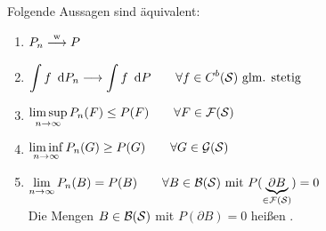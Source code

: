
\begin{theorem}\label{satz: 4.2}
	Folgende Aussagen sind äquivalent:
	\begin{enumerate}[label=(\arabic*)]
		\item \label{it:4.2weakConv} $\begin{aligned}
			P_n \mathrel{\overset{\text{w}}{\longrightarrow}} P
		\end{aligned}$
	\item \label{it:4.2f} $\begin{aligned}
			\int f \enskip \mathrm{d}P_n \longrightarrow \int f \enskip \mathrm{d}P \qquad \forall f \in C^b(\mathcal{S}) \text{ glm. stetig}
		\end{aligned}$
	\item \label{it:4.2ClosedSets} $\begin{aligned}
			\limsup_{n \to \infty} P_n(F) \le P(F) \qquad \forall F \in \mathcal{F}(\mathcal{S})
		\end{aligned}$
	\item \label{it:4.2OpenSets} $\begin{aligned}
			\liminf_{n \to \infty} P_n(G)\ge P(G) \qquad \forall G \in \mathcal{G}(\mathcal{S})
		\end{aligned}$
	\item \label{it:4.2BorelSets} $\lim\limits_{n \to \infty} P_n(B) = P(B) \qquad \forall B \in \mathcal{B}(\mathcal{S}) \text{ mit } P(\underbrace{\partial B}_{ \in\mathcal{F}(\mathcal{S})}) = 0$ \\
		Die Mengen $B \in \mathcal{B}(\mathcal{S})$ mit $P(\partial B)=0$ heißen .
	\end{enumerate}
\end{theorem}

